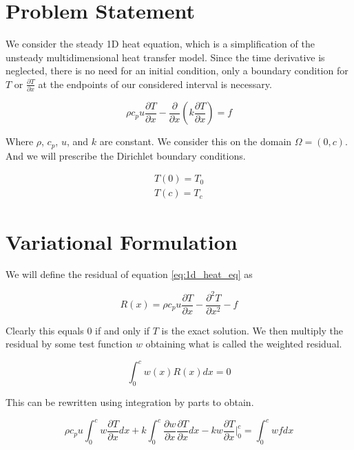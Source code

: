 \documentclass[10pt]{amsart}
\numberwithin{equation}{section}
\theoremstyle{definition}
\newcommand{\pder}[2][]{\frac{\partial#1}{\partial#2}}
\newcommand{\spder}[2][]{\frac{\partial^2 #1}{\partial#2^2}}
\begin{document}
\begin{multicols}{2}
  \section{Problem Statement}%
  \label{sec:problem_statement}

  We consider the steady 1D heat equation, which is a simplification of the
  unsteady multidimensional heat transfer model. Since the time derivative is
  neglected, there is no need for an initial condition, only a boundary condition
  for $T$ or $\pder[T]{x}$ at the endpoints of our considered interval is
  necessary.

  \begin{equation}\label{eq:1d_heat_eq}
    \rho c_p u \pder[T]{x}-\pder{x}\left(k\pder[T]{x}\right)=f
  \end{equation}

  Where $\rho$, $c_p$, $u$, and $k$ are constant. We consider this on the domain
  $\Omega=(0,c)$. And we will prescribe the Dirichlet boundary conditions.

  \begin{align*}
    T(0) = T_0\\
    T(c) = T_c
  \end{align*}

  \section{Variational Formulation}%
  \label{sec:variational_formulation}

  We will define the residual of equation \eqref{eq:1d_heat_eq} as

  \begin{equation*}
    R(x) = \rho c_p u\pder[T]{x}-\spder[T]{x}-f
  \end{equation*}

  Clearly this equals $0$ if and only if $T$ is the exact solution. We then
  multiply the residual by some test function $w$ obtaining what is called the
  weighted residual.

  \begin{equation*}
    \int_0^cw(x)R(x)dx=0
  \end{equation*}

  This can be rewritten using integration by parts to obtain.

  \begin{equation*}
    \rho c_p
    u\int_0^cw\pder[T]{x}dx+k\int_0^c\pder[w]{x}\pder[T]{x}dx-kw\pder[T]{x}\Bigr|_0^c=\int_0^cwfdx
  \end{equation*}


\end{multicols}
\end{document}
